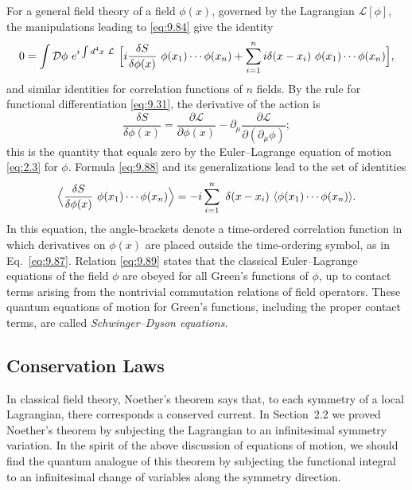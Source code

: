 For a general field theory of a field $\phi(x)$, governed by the Lagrangian
$\mathcal{L}[\phi]$, the manipulations leading to \eqref{eq:9.84} give the
identity
\begin{equation}
  0 = \int \mathcal{D}\phi\ e^{i\int d^4x\ \mathcal{L}}\ \Bigl[
    i\frac{\delta S}{\delta\phi(x)}\ \phi(x_1)\cdots\phi(x_n)
    + \sum_{i=1}^{n} i\delta(x-x_i)\ \phi(x_1)\cdots\phi(x_n) \Bigr] ,
  \label{eq:9.88}
\end{equation}
and similar identities for correlation functions of $n$ fields.  By the rule
for functional differentiation \eqref{eq:9.31}, the derivative of the action
is
\begin{equation}
  \frac{\delta S}{\delta\phi(x)} = \frac{\partial\mathcal{L}}
    {\partial\phi(x)} - \partial_\mu
      \frac{\partial\mathcal{L}}{\partial(\partial_\mu\phi)} ;
\end{equation}
this is the quantity that equals zero by the Euler--Lagrange equation of
motion \eqref{eq:2.3} for $\phi$.  Formula \eqref{eq:9.88} and its
generalizations lead to the set of identities
\begin{equation}
  \Bigl\langle \frac{\delta S}{\delta\phi(x)}\ \phi(x_1)\cdots\phi(x_n)
    \Bigr\rangle = -i\sum_{i=1}^{n}\ \delta(x-x_i)\
    \langle \phi(x_1)\cdots\phi(x_n) \rangle .
  \label{eq:9.89}
\end{equation}
In this equation, the angle-brackets denote a time-ordered correlation
function in which derivatives on $\phi(x)$ are placed outside the
time-ordering symbol, as in Eq.~\eqref{eq:9.87}.  Relation \eqref{eq:9.89}
states that the classical Euler--Lagrange equations of the field $\phi$ are
obeyed for all Green's functions of $\phi$, up to contact terms arising from
the nontrivial commutation relations of field operators.  These quantum
equations of motion for Green's functions, including the proper contact terms,
are called \emph{Schwinger--Dyson equations}.

\subsection{Conservation Laws}

In classical field theory, Noether's theorem says that, to each symmetry of a
local Lagrangian, there corresponds a conserved current.  In Section~2.2 we
proved Noether's theorem by subjecting the Lagrangian to an infinitesimal
symmetry variation.  In the spirit of the above discussion of equations of
motion, we should find the quantum analogue of this theorem by subjecting the
functional integral to an infinitesimal change of variables along the symmetry
direction.

